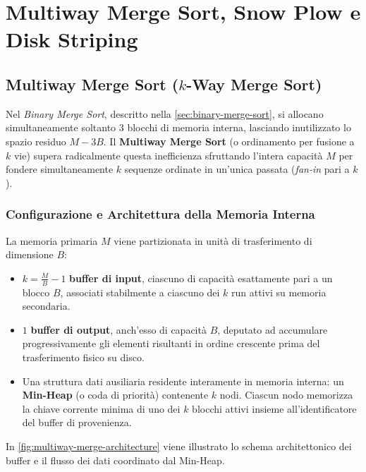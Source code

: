 \chapter{Multiway Merge Sort, Snow Plow e Disk Striping}
\label{cha:lecture-four}

\FloatBarrier
\section{Multiway Merge Sort (\texorpdfstring{$k$}{k}-Way Merge Sort)}
\label{sec:multiway-merge-sort}

Nel \textit{Binary Merge Sort}, descritto nella \autoref{sec:binary-merge-sort}, si allocano simultaneamente soltanto 3 blocchi di memoria interna, lasciando inutilizzato lo spazio residuo $M - 3B$. Il \textbf{Multiway Merge Sort} (o ordinamento per fusione a $k$ vie) supera radicalmente questa inefficienza sfruttando l'intera capacità $M$ per fondere simultaneamente $k$ sequenze ordinate in un'unica passata (\textit{fan-in} pari a $k$).

\FloatBarrier
\subsection{Configurazione e Architettura della Memoria Interna}
\label{subsec:multiway-memory-layout}

La memoria primaria $M$ viene partizionata in unità di trasferimento di dimensione $B$:
\begin{itemize}
  \item $k = \frac{M}{B} - 1$ \textbf{buffer di input}, ciascuno di capacità esattamente pari a un blocco $B$, associati stabilmente a ciascuno dei $k$ run attivi su memoria secondaria.
  \item $1$ \textbf{buffer di output}, anch'esso di capacità $B$, deputato ad accumulare progressivamente gli elementi risultanti in ordine crescente prima del trasferimento fisico su disco.
  \item Una struttura dati ausiliaria residente interamente in memoria interna: un \textbf{Min-Heap} (o coda di priorità) contenente $k$ nodi. Ciascun nodo memorizza la chiave corrente minima di uno dei $k$ blocchi attivi insieme all'identificatore del buffer di provenienza.
\end{itemize}

In \autoref{fig:multiway-merge-architecture} viene illustrato lo schema architettonico dei buffer e il flusso dei dati coordinato dal Min-Heap.

